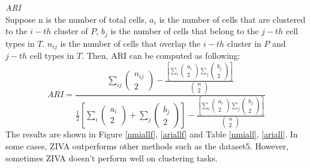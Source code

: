 \vspace{0.5cm}
\noindent\emph{ARI} \\
Suppose n is the number of total cells, $a_i$ is the number of cells that are clustered to the $i-th$ cluster of $P$, $b_j$ is the number of cells that belong to the $j-th$ cell types in $T$. $n_{ij}$ is the number of cells that overlap the $i-th$ cluster in $P$ and $j-th$ cell types in $T$. Then, ARI can be computed as following:
\begin{equation}
    ARI = \frac{\sum_{i j}\left(\begin{array}{c}n_{i j} \\ 2\end{array}\right)-\frac{\left[\sum_{i}\left(\begin{array}{c}a_{i} \\ 2\end{array}\right) \sum_{j}\left(\begin{array}{c}b_{j} \\ 2\end{array}\right)\right]}{\left(\begin{array}{l}n \\ 2\end{array}\right)}}{\frac{1}{2}\left[\sum_{i}\left(\begin{array}{c}a_{i} \\ 2\end{array}\right)+\sum_{j}\left(\begin{array}{c}b_{j} \\ 2\end{array}\right)\right]-\frac{\left[\sum_{i}\left(\begin{array}{c}a_{i} \\ 2\end{array}\right) \sum_{j}\left(\begin{array}{c}b_{j} \\ 2\end{array}\right)\right]}{\left(\begin{array}{l}n \\ 2\end{array}\right)}}
\end{equation}
The results are shown in Figure \ref{nmiallf}, \ref{ariallf} and Table \ref{nmiall}, \ref{ariall}. In some cases, ZIVA outperforms other methods such as the dataset5. However, sometimes ZIVA doesn't perform well on clustering tasks.

